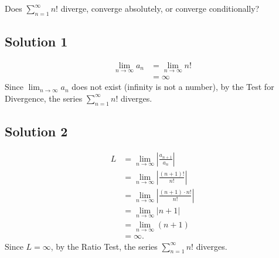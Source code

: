 \documentclass{article}
\begin{document}
\noindent
Does $\displaystyle \sum_{n=1}^\infty n!$
diverge, converge absolutely, or converge conditionally?

\subsection*{Solution 1}

\begin{align*}
\lim_{n \to \infty} a_n
&= \lim_{n \to \infty} n!\\
&= \infty
\end{align*}
Since $\lim_{n \to \infty} a_n$ does not exist (infinity is not a number), by the Test for Divergence, the series $\displaystyle \sum_{n=1}^\infty n!$ diverges.

\subsection*{Solution 2}

\begin{align*}
L&=\lim_{n \to \infty} \left|\frac{a_{n+1}}{a_n}\right|\\
&= \lim_{n \to \infty} \left| \frac{(n+1)!}{n!}\right|\\
&= \lim_{n \to \infty} \left| \frac{(n+1) \cdot n!}{n!}\right|\\
&= \lim_{n \to \infty} \left| n+1 \right|\\
&= \lim_{n \to \infty} (n+1)\\
&= \infty.
\end{align*}
Since $L = \infty$, by the Ratio Test, the series $\displaystyle \sum_{n=1}^\infty n!$ diverges.
\end{document}
